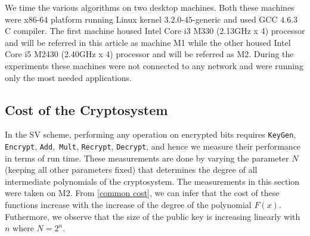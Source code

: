 \documentclass{acm_proc_article-sp}
\begin{document}
We time the various algorithms on two desktop machines. Both these machines were x86-64 platform running Linux kernel $3.2.0$-$45$-generic  and used GCC $4.6.3$ C compiler.  The first machine housed Intel Core i3 M330 (2.13GHz x 4) processor and will be referred in this article as machine M1 while the other housed Intel Core i5 M2430 (2.40GHz x 4) processor and will be referred as M2. During the experiments these machines were not connected to any network and were running only the most needed applications.
 
\subsection{Cost of the Cryptosystem}
 In the SV scheme, performing any operation on encrypted bits requires  \texttt{KeyGen}, \texttt{Encrypt}, \texttt{Add},\texttt{ Mult}, \texttt{Recrypt}, \texttt{Decrypt}, and hence we measure their performance in terms of run time. These measurements are done by varying the parameter $N$(keeping all other parameters fixed) that determines the degree of all intermediate polynomials of the cryptosystem. The measurements in this section were taken on M2. From \autoref{common cost}, we can infer that the cost of these functions increase with the increase of the degree of the polynomial $F(x)$. Futhermore, we observe that the size of the public key is increasing linearly with $n$  where $N=2^n$.  

\begin{table}[htb]
  \centering
  \caption{Run time (ms)}
\end{table}
\end{document}

